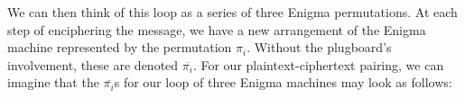 \begin{center}
\end{center}
We can then think of this loop as a series of three Enigma
permutations. At each step of enciphering the message, we have a new
arrangement of the Enigma machine represented by the permutation
$\pi_i$. Without the plugboard's involvement, these are denoted
$\overline{\pi_i}$. For our plaintext-ciphertext pairing, we can
imagine that the $\overline{\pi_i}$s for our loop of three Enigma
machines may look as follows:
